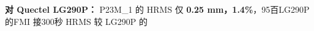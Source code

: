 \documentclass[11pt,a4paper]{article}
\numberwithin{equation}{section}
\numberwithin{figure}{section}
\begin{document}
\textbf{{\cjkfont 对}\allowbreak{} Quectel LG290P{\cjkfont ：}\allowbreak{}} P23M\_1 {\cjkfont 的}\allowbreak{} HRMS {\cjkfont 仅}\allowbreak{} \textbf{0.25 mm{\cjkfont ，}\allowbreak{}1.4\%}{\cjkfont ，}\allowbreak{}95{\cjkfont 百}\allowbreak{}LG290P {\cjkfont 的}\allowbreak{}FMI {\cjkfont 接}\allowbreak{}300{\cjkfont 秒}\allowbreak{} HRMS {\cjkfont 较}\allowbreak{} LG290P {\cjkfont 的}\allowbreak{}
\end{document}
